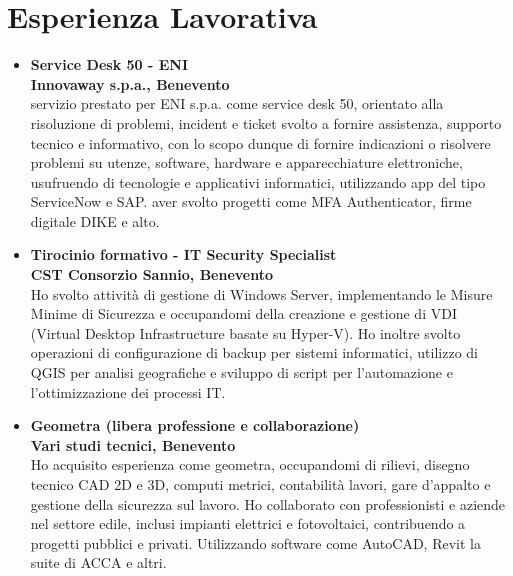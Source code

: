 \documentclass[a4paper,10pt]{article}
\begin{document}
\section*{\faBriefcase \quad Esperienza Lavorativa}
\begin{itemize}[leftmargin=*]
  \item \textbf{\textcolor{mainblue}{Service Desk 50 - ENI}}\\
  \textbf {Innovaway s.p.a., Benevento \quad {[17/02/2022 - 31/07/2025]}}\\
  servizio prestato per ENI s.p.a. come service desk 50, orientato alla risoluzione di problemi, incident e ticket svolto a fornire assistenza, supporto tecnico e informativo, con lo scopo dunque di fornire indicazioni o risolvere problemi su utenze, software, hardware e apparecchiature elettroniche, usufruendo di tecnologie e applicativi informatici, utilizzando app del tipo ServiceNow e SAP. aver svolto progetti come MFA Authenticator, firme digitale DIKE e alto.
  
  \item \textbf{\textcolor{mainblue}{Tirocinio formativo - IT Security Specialist}}\\
  \textbf {CST Consorzio Sannio, Benevento \quad {[12/09/2019 – 26/11/2019]}}\\
  Ho svolto attività di gestione di Windows Server, implementando le Misure Minime di Sicurezza e occupandomi della creazione e gestione di VDI (Virtual Desktop Infrastructure basate su Hyper-V). Ho inoltre svolto operazioni di configurazione di backup per sistemi informatici, utilizzo di QGIS per analisi geografiche e sviluppo di script per l'automazione e l'ottimizzazione dei processi IT.

  \item \textbf{\textcolor{mainblue}{Geometra (libera professione e collaborazione)}}\\
  \textbf {Vari studi tecnici, Benevento \quad {[ 05/09/2011 – 30/03/2019]}}\\
  Ho acquisito esperienza come geometra, occupandomi di rilievi, disegno tecnico CAD 2D e 3D, computi metrici, contabilità lavori, gare d’appalto e gestione della sicurezza sul lavoro. Ho collaborato con professionisti e aziende nel settore edile, inclusi impianti elettrici e fotovoltaici, contribuendo a progetti pubblici e privati. Utilizzando software come AutoCAD, Revit la suite di ACCA e altri.
\end{itemize}

\hrulefill
\end{document}
